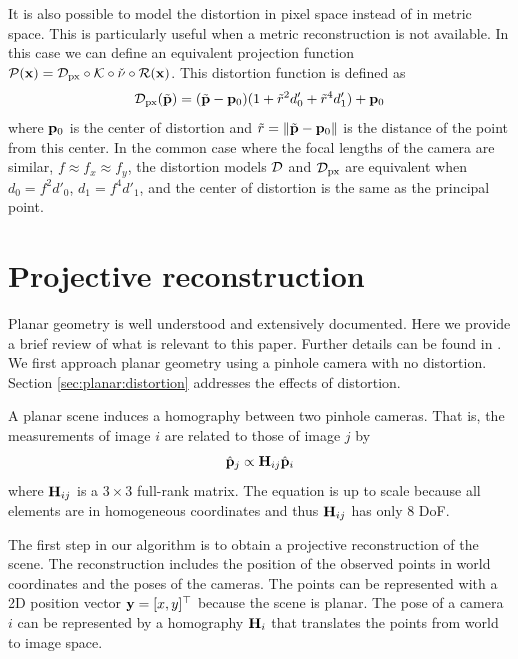 \documentclass[10pt,twocolumn,letterpaper]{article}
\begin{document}
It is also possible to model the distortion in pixel space instead of in metric space. This is particularly useful when a metric reconstruction is not available. In this case we can define an equivalent projection function $\mathcal{P}(\mathbf{x}) = \mathcal{D}_{\text{px}} \circ \mathcal{K} \circ \check{\nu} \circ \mathcal{R}(\mathbf{x})$. This distortion function is defined as
%
\begin{align}
\mathcal{D}_{\text{px}}(\tilde{\mathbf{p}}) = (\tilde{\mathbf{p}} - \mathbf{p}_0)(1+\tilde{r}^2 d'_0 + \tilde{r}^4 d'_1) + \mathbf{p}_0
\label{eq:distortion_pixels}
\end{align}
%
where $\mathbf{p}_0$ is the center of distortion and $\tilde{r}=\lVert\tilde{\mathbf{p}}-\mathbf{p}_0\rVert$ is the distance of the point from this center. In the common case where the focal lengths of the camera are similar, \ie $f \approx f_x \approx f_y$, the distortion models $\mathcal{D}$ and $\mathcal{D}_{\text{px}}$ are equivalent when $d_0 = f^2 d'_0$, $d_1=f^4 d'_1$, and the center of distortion is the same as the principal point.

\section{Projective reconstruction}
\label{sec:projective}

Planar geometry is well understood and extensively documented. Here we provide a brief review of what is relevant to this paper. Further details can be found in \cite{hartley2003}. We first approach planar geometry using a pinhole camera with no distortion. Section \ref{sec:planar:distortion} addresses the effects of distortion.

A planar scene induces a homography between two pinhole cameras. That is, the measurements of image $i$ are related to those of image $j$ by
%
\begin{align}
\hat{\mathbf{p}}_j \propto \mathbf{H}_{ij} \hat{\mathbf{p}}_i 
\label{eq:homography}
\end{align}
%
where $\mathbf{H}_{ij}$ is a $3 \times 3$ full-rank matrix. The equation is up to scale because all elements are in homogeneous coordinates and thus $\mathbf{H}_{ij}$ has only 8 DoF.

The first step in our algorithm is to obtain a projective reconstruction of the scene. The reconstruction includes the position of the observed points in world coordinates and the poses of the cameras. The points can be represented with a 2D position vector $\mathbf{y}=[x,y]^\top$ because the scene is planar. The pose of a camera $i$ can be represented by a homography $\mathbf{H}_i$ that translates the points from world to image space. 
\end{document}
